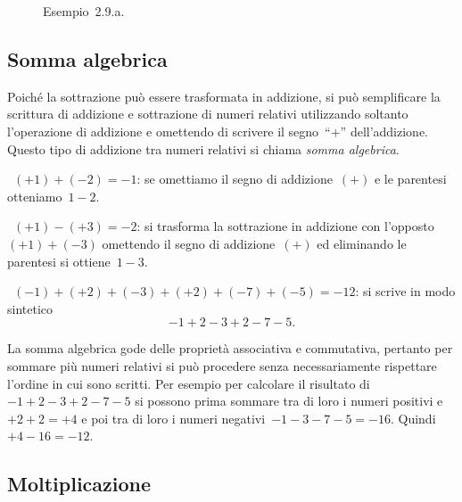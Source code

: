 \begin{figure}[t]
 \centering
 \caption{Esempio~2.9.a.}
\end{figure}

\ovalbox{\risolvii \ref{ese:2.9}, \ref{ese:2.10}, \ref{ese:2.11}, \ref{ese:2.12}, \ref{ese:2.13}}

\subsection{Somma algebrica}

Poiché la sottrazione può essere trasformata in addizione, si può semplificare la scrittura di addizione
e sottrazione di numeri relativi utilizzando soltanto l'operazione di addizione e omettendo di scrivere
il segno~``$+$'' dell'addizione. Questo tipo di addizione tra numeri relativi si chiama \emph{somma algebrica}.

\begin{exrig}
 \begin{esempio}
~$(+1)+(-2)=-1$: se omettiamo il segno di addizione~$(+)$ e le parentesi otteniamo~$1-2$.
 \end{esempio}

\begin{esempio}
~$(+1)-(+3)=-2$: si trasforma la sottrazione in addizione con l'opposto~$(+1)+(-3)$ omettendo il segno
di addizione~$(+)$ ed eliminando le parentesi si ottiene~$1-3$.
 \end{esempio}

\begin{esempio}
~$(-1)+(+2)+(-3)+(+2)+(-7)+(-5)=-12$: si scrive in modo sintetico \[-1+2-3+2-7-5.\]
 \end{esempio}

\end{exrig}

La somma algebrica gode delle proprietà associativa e commutativa, pertanto per sommare più numeri relativi
si può procedere senza necessariamente rispettare l'ordine in cui sono scritti. Per esempio per calcolare
il risultato di~$-1+2-3+2-7-5$ si possono prima sommare tra di loro i numeri positivi e~$+2+2=+4$
e poi tra di loro i numeri negativi~$-1-3-7-5=-16$. Quindi~$+4-16=-12$.

\vspazio\ovalbox{\risolvii \ref{ese:2.14}, \ref{ese:2.15}}

\subsection{Moltiplicazione}

